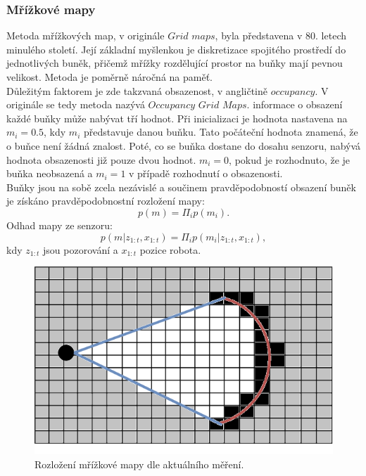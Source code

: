 \documentclass[12pt]{report}
\begin{document}
\subsubsection{Mřížkové mapy}
Metoda mřížkových map, v originále $Grid$ $maps$, byla představena v 80. letech minulého století. Její základní myšlenkou je diskretizace spojitého prostředí do jednotlivých buněk, přičemž mřížky rozdělující prostor na buňky mají pevnou velikost. Metoda je poměrně náročná na paměť.\\
\indent Důležitým faktorem je zde takzvaná obsazenost, v angličtině $occupancy$. V originále se tedy metoda nazývá $Occupancy$ $Grid$ $Maps$. informace o obsazení každé buňky může nabývat tří hodnot. Při inicializaci je hodnota nastavena na $m_i=0.5$, kdy $m_i$ představuje danou buňku. Tato počáteční hodnota znamená, že o buňce není žádná znalost. Poté, co se buňka dostane do dosahu senzoru, nabývá hodnota obsazenosti již pouze dvou hodnot. $m_i=0$, pokud je rozhodnuto, že je buňka neobsazená a $m_i=1$ v případě rozhodnutí o obsazenosti.\\
\indent Buňky jsou na sobě zcela nezávislé a součinem pravděpodobností obsazení buněk je získáno pravděpodobnostní rozložení mapy:
\begin{equation}
	p(m)=\Pi_ip(m_i).
\end{equation}
Odhad mapy ze senzoru:
\begin{equation}
	p(m|z_{1:t},x_{1:t})=\Pi_ip(m_i|z_{1:t},x_{1:t}),
\end{equation}
kdy $z_{1:t}$ jsou pozorování a $x_{1:t}$ pozice robota.

\begin{figure}[!ht]
	\begin{center}
		\includegraphics[width=0.7\columnwidth]{imgs/gridmap.png}
	\end{center}
	\caption{Rozložení mřížkové mapy dle aktuálního měření.}
	\label{fig:grid_map}
\end{figure}
\newpage
\end{document}
